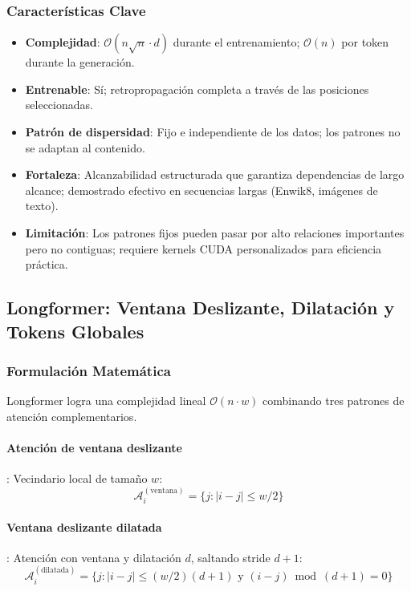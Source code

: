 \documentclass[11pt,a4paper]{article}
\begin{document}
\subsubsection{Características Clave}

\begin{itemize}[leftmargin=*]
    \item \textbf{Complejidad}: $\mathcal{O}(n\sqrt{n} \cdot d)$ durante el entrenamiento; $\mathcal{O}(n)$ por token durante la generación.
    \item \textbf{Entrenable}: Sí; retropropagación completa a través de las posiciones seleccionadas.
    \item \textbf{Patrón de dispersidad}: Fijo e independiente de los datos; los patrones no se adaptan al contenido.
    \item \textbf{Fortaleza}: Alcanzabilidad estructurada que garantiza dependencias de largo alcance; demostrado efectivo en secuencias largas (Enwik8, imágenes de texto).
    \item \textbf{Limitación}: Los patrones fijos pueden pasar por alto relaciones importantes pero no contiguas; requiere kernels CUDA personalizados para eficiencia práctica.
\end{itemize}

\subsection{Longformer: Ventana Deslizante, Dilatación y Tokens Globales}

\subsubsection{Formulación Matemática}

Longformer \citep{beltagy_longformer_2020} logra una complejidad lineal $\mathcal{O}(n \cdot w)$ combinando tres patrones de atención complementarios.

\paragraph{Atención de ventana deslizante}: Vecindario local de tamaño $w$:
\[
\mathcal{A}_i^{(\text{ventana})} = \{j : |i - j| \leq w/2\}
\]

\paragraph{Ventana deslizante dilatada}: Atención con ventana y dilatación $d$, saltando stride $d+1$:
\[
\mathcal{A}_i^{(\text{dilatada})} = \{j : |i - j| \leq (w/2)(d+1) \text{ y } (i-j) \bmod (d+1) = 0\}
\]
\end{document}
